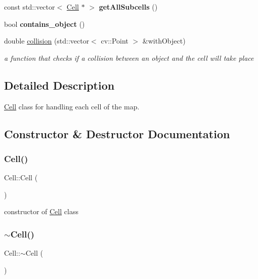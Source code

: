 \begin{DoxyCompactItemize}
const std\+::vector$<$ \mbox{\hyperlink{class_cell}{Cell}} $\ast$ $>$ {\bfseries get\+All\+Subcells} ()
\item 
\mbox{\label{class_cell_a7182bd8459f98bafdec19697e283a06a}} 
bool {\bfseries contains\+\_\+object} ()
\item 
double \mbox{\hyperlink{class_cell_acc1faa0802609404e8058263004087ea}{collision}} (std\+::vector$<$ cv\+::\+Point $>$ \&with\+Object)
\begin{DoxyCompactList}\small\item\em a function that checks if a collision between an object and the cell will take place \end{DoxyCompactList}\end{DoxyCompactItemize}


\subsection{Detailed Description}
\mbox{\hyperlink{class_cell}{Cell}} class for handling each cell of the map. 

\subsection{Constructor \& Destructor Documentation}
\mbox{\label{class_cell_a394510643e8664cf12b5efaf5cb99f71}} 
\subsubsection{\texorpdfstring{Cell()}{Cell()}}
{\footnotesize\ttfamily Cell\+::\+Cell (\begin{DoxyParamCaption}{ }\end{DoxyParamCaption})}

constructor of \mbox{\hyperlink{class_cell}{Cell}} class \mbox{\label{class_cell_a9fa559f7a28e2b4336c6879ca09304d8}} 
\subsubsection{\texorpdfstring{$\sim$\+Cell()}{~Cell()}}
{\footnotesize\ttfamily Cell\+::$\sim$\+Cell (\begin{DoxyParamCaption}{ }\end{DoxyParamCaption})}

